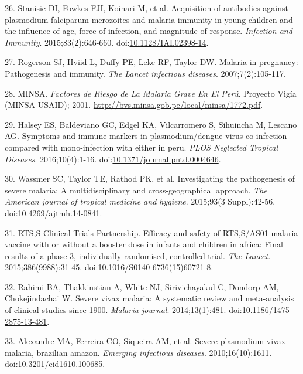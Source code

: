 \documentclass[]{article}
\begin{document}
\hypertarget{ref-Stanisic2015}{}
26. Stanisic DI, Fowkes FJI, Koinari M, et al. Acquisition of antibodies
against plasmodium falciparum merozoites and malaria immunity in young
children and the influence of age, force of infection, and magnitude of
response. \emph{Infection and Immunity}. 2015;83(2):646-660.
doi:\href{https://doi.org/10.1128/IAI.02398-14}{10.1128/IAI.02398-14}.

\hypertarget{ref-rogerson2007preg}{}
27. Rogerson SJ, Hviid L, Duffy PE, Leke RF, Taylor DW. Malaria in
pregnancy: Pathogenesis and immunity. \emph{The Lancet infectious
diseases}. 2007;7(2):105-117.

\hypertarget{ref-factores2001}{}
28. MINSA. \emph{Factores de Riesgo de La Malaria Grave En El Perú}.
Proyecto Vigía (MINSA-USAID); 2001.
\url{http://bvs.minsa.gob.pe/local/minsa/1772.pdf}.

\hypertarget{ref-baldevi2016}{}
29. Halsey ES, Baldeviano GC, Edgel KA, Vilcarromero S, Sihuincha M,
Lescano AG. Symptoms and immune markers in plasmodium/dengue virus
co-infection compared with mono-infection with either in peru.
\emph{PLOS Neglected Tropical Diseases}. 2016;10(4):1-16.
doi:\href{https://doi.org/10.1371/journal.pntd.0004646}{10.1371/journal.pntd.0004646}.

\hypertarget{ref-wassmer2015}{}
30. Wassmer SC, Taylor TE, Rathod PK, et al. Investigating the
pathogenesis of severe malaria: A multidisciplinary and
cross-geographical approach. \emph{The American journal of tropical
medicine and hygiene}. 2015;93(3 Suppl):42-56.
doi:\href{https://doi.org/10.4269/ajtmh.14-0841}{10.4269/ajtmh.14-0841}.

\hypertarget{ref-rts2015}{}
31. RTS,S Clinical Trials Partnership. Efficacy and safety of RTS,S/AS01
malaria vaccine with or without a booster dose in infants and children
in africa: Final results of a phase 3, individually randomised,
controlled trial. \emph{The Lancet}. 2015;386(9988):31-45.
doi:\href{https://doi.org/10.1016/S0140-6736(15)60721-8}{10.1016/S0140-6736(15)60721-8}.

\hypertarget{ref-rahimi2014meta}{}
32. Rahimi BA, Thakkinstian A, White NJ, Sirivichayakul C, Dondorp AM,
Chokejindachai W. Severe vivax malaria: A systematic review and
meta-analysis of clinical studies since 1900. \emph{Malaria journal}.
2014;13(1):481.
doi:\href{https://doi.org/10.1186/1475-2875-13-481}{10.1186/1475-2875-13-481}.

\hypertarget{ref-alexandre2010}{}
33. Alexandre MA, Ferreira CO, Siqueira AM, et al. Severe plasmodium
vivax malaria, brazilian amazon. \emph{Emerging infectious diseases}.
2010;16(10):1611.
doi:\href{https://doi.org/10.3201/eid1610.100685}{10.3201/eid1610.100685}.
\end{document}
